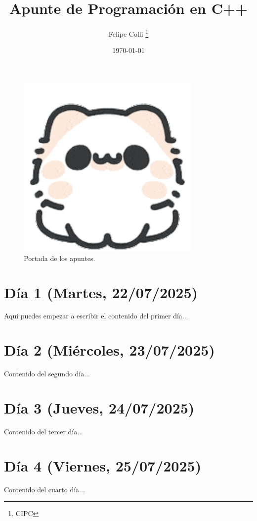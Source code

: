 \documentclass[11pt]{article}
\title{Apunte de Programación en C++}
\author{Felipe Colli \thanks{CIPC}}
\date{\today}
\begin{document}
\maketitle

\begin{figure}[htbp]
    \centering
    \includegraphics[width=0.8\textwidth]{gatito}
    \caption{Portada de los apuntes.} %
\end{figure}

\newpage
\tableofcontents %
\newpage


\section{Día 1 (Martes, 22/07/2025)}
Aquí puedes empezar a escribir el contenido del primer día...

\newpage


\section{Día 2 (Miércoles, 23/07/2025)}
Contenido del segundo día...

\newpage
\section{Día 3 (Jueves, 24/07/2025)}
Contenido del tercer día...

\newpage
\section{Día 4 (Viernes, 25/07/2025)}
Contenido del cuarto día...
\end{document}
